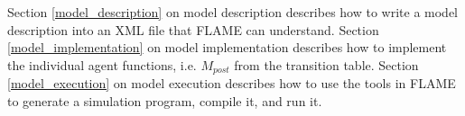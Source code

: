 Section \ref{model_description} on model description describes how to write a
model description into an XML file that FLAME can understand. Section
\ref{model_implementation} on model implementation describes how to implement
the individual agent functions, i.e. $M_{post}$ from the transition table.
Section \ref{model_execution} on model execution describes how to use the tools
in FLAME to generate a simulation program, compile it, and run it.

%
%
